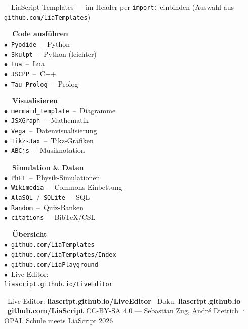 \documentclass[a4paper,landscape,9pt]{extarticle}
\begin{document}
\noindent
\begin{liainfo}{\faPuzzlePiece~~LiaScript-Templates — im Header per \texttt{import:} einbinden (Auswahl aus \texttt{github.com/LiaTemplates})}
\footnotesize
\begin{minipage}[t]{0.24\linewidth}
\textbf{\color{liagreen}\faTerminal~~Code ausführen}\\[1pt]
$\bullet$~\texttt{Pyodide}~–~Python\\
$\bullet$~\texttt{Skulpt}~–~Python (leichter)\\
$\bullet$~\texttt{Lua}~–~Lua\\
$\bullet$~\texttt{JSCPP}~–~C++\\
$\bullet$~\texttt{Tau-Prolog}~–~Prolog
\end{minipage}\hfill
\begin{minipage}[t]{0.24\linewidth}
\textbf{\color{liagreen}\faChartBar~~Visualisieren}\\[1pt]
$\bullet$~\texttt{mermaid\_template}~–~Diagramme\\
$\bullet$~\texttt{JSXGraph}~–~Mathematik\\
$\bullet$~\texttt{Vega}~–~Datenvisualisierung\\
$\bullet$~\texttt{Tikz-Jax}~–~Tikz-Grafiken\\
$\bullet$~\texttt{ABCjs}~–~Musiknotation
\end{minipage}\hfill
\begin{minipage}[t]{0.24\linewidth}
\textbf{\color{liagreen}\faFlask~~Simulation \& Daten}\\[1pt]
$\bullet$~\texttt{PhET}~–~Physik-Simulationen\\
$\bullet$~\texttt{Wikimedia}~–~Commons-Einbettung\\
$\bullet$~\texttt{AlaSQL}~/~\texttt{SQLite}~–~SQL\\
$\bullet$~\texttt{Random}~–~Quiz-Banken\\
$\bullet$~\texttt{citations}~–~BibTeX/CSL
\end{minipage}\hfill
\begin{minipage}[t]{0.24\linewidth}
\textbf{\color{liagreen}\faGithub~~Übersicht}\\[1pt]
$\bullet$~\texttt{github.com/LiaTemplates}\\
$\bullet$~\texttt{github.com/LiaTemplates/Index}\\
$\bullet$~\texttt{github.com/LiaPlayground}\\
$\bullet$~Live-Editor:\\
\hspace*{0.6em}\texttt{liascript.github.io/LiveEditor}
\end{minipage}
\end{liainfo}

\vspace{4pt}
{\sffamily\scriptsize\color{muted}
\faInfoCircle~Live-Editor: \textbf{liascript.github.io/LiveEditor}\hfill
\faBook~Doku: \textbf{liascript.github.io}\hfill
\faGithub~\textbf{github.com/LiaScript} \quad
CC-BY-SA 4.0 — Sebastian Zug, André Dietrich · OPAL Schule meets LiaScript 2026}
\end{document}
